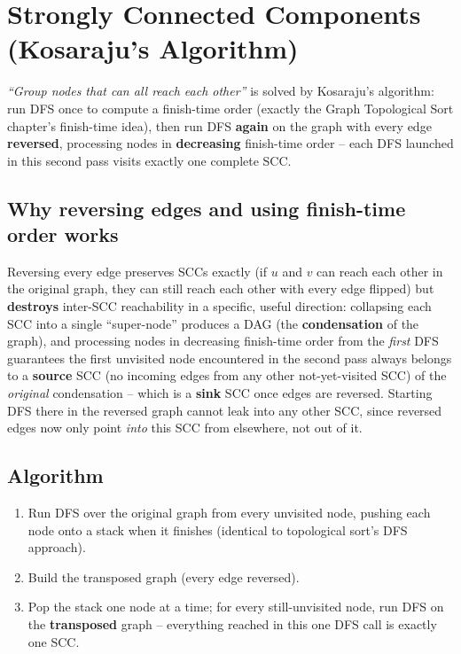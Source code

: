 \section{Strongly Connected Components (Kosaraju's Algorithm)}
\label{sec:graph-kosaraju}


\begin{patternbox}
\emph{``Group nodes that can all reach each other''} is solved by
Kosaraju's algorithm: run DFS once to compute a finish-time order
(exactly the Graph Topological Sort chapter's finish-time idea), then
run DFS \textbf{again} on the graph with every edge \textbf{reversed},
processing nodes in \textbf{decreasing} finish-time order -- each DFS
launched in this second pass visits exactly one complete SCC.
\end{patternbox}

\subsection*{Why reversing edges and using finish-time order works}

Reversing every edge preserves SCCs exactly (if $u$ and $v$ can reach
each other in the original graph, they can still reach each other with
every edge flipped) but \textbf{destroys} inter-SCC reachability in a
specific, useful direction: collapsing each SCC into a single
``super-node'' produces a DAG (the \textbf{condensation} of the
graph), and processing nodes in decreasing finish-time order from the
\emph{first} DFS guarantees the first unvisited node encountered in
the second pass always belongs to a \textbf{source} SCC (no incoming
edges from any other not-yet-visited SCC) of the \emph{original}
condensation -- which is a \textbf{sink} SCC once edges are reversed.
Starting DFS there in the reversed graph cannot leak into any other
SCC, since reversed edges now only point \emph{into} this SCC from
elsewhere, not out of it.

\subsection*{Algorithm}

\begin{enumerate}
  \item Run DFS over the original graph from every unvisited node,
        pushing each node onto a stack when it finishes (identical to
        topological sort's DFS approach).
  \item Build the transposed graph (every edge reversed).
  \item Pop the stack one node at a time; for every still-unvisited
        node, run DFS on the \textbf{transposed} graph -- everything
        reached in this one DFS call is exactly one SCC.
\end{enumerate}

